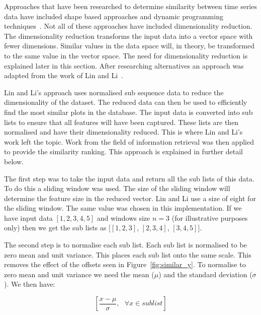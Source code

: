 Approaches that have been researched to determine similarity between time series data have included shape based approaches and dynamic programming techniques~\cite{agrawal, nakamura, keogh}.  Not all of these approaches have included dimensionality reduction.  The dimensionality reduction transforms the input data into a vector space with fewer dimensions.  Similar values in the data space will, in theory, be transformed to the same value in the vector space.  The need for dimensionality reduction is explained later in this section.  After researching alternatives an approach was adapted from the work of Lin and Li~\cite{structural_similarity}.

Lin and Li's approach uses normalised sub sequence data to reduce the dimensionality of the dataset.  The reduced data can then be used to efficiently find the most similar plots in the database.  The input data is converted into sub lists to ensure that all features will have been captured.  These lists are then normalised and have their dimensionality reduced.  This is where Lin and Li's work left the topic.  Work from the field of information retrieval was then applied to provide the similarity ranking. This approach is explained in further detail below.

The first step was to take the input data and return all the sub lists of this data.  To do this a sliding window was used.  The size of the sliding window will determine the feature size in the reduced vector.  Lin and Li use a size of eight for the sliding window.  The same value was chosen in this implementation.  If we have input data $[1,2,3,4,5]$ and windows size $n = 3$ (for illustrative purposes only) then we get the sub lists as $[[1,2,3]$, $[2,3,4]$, $[3,4,5]]$.

The second step is to normalise each sub list.  Each sub list is normalised to be zero mean and unit variance.  This places each sub list onto the same scale.  This removes the effect of the offsets seen in Figure~\ref{fig:similar_y}.  To normalise to zero mean and unit variance we need the mean ($\mu$) and the standard deviation ($\sigma$).  We then have:

$$
\left[\frac{x - \mu}{\sigma},\text{   } \forall x \in sublist\right]
$$


